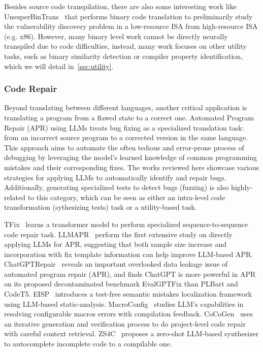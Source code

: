 \documentclass[pdflatex,sn-mathphys-ay,twocolumn, a4paper]{sn-jnl}%
\theoremstyle{thmstyleone}%
\theoremstyle{thmstyletwo}%
\theoremstyle{thmstylethree}%
\begin{document}
Besides source code transpilation, there are also some interesting work like UnsuperBinTrans~\citep{168_unsupervised2023_emnlp} that performs binary code translation to preliminarily study the vulnerability discovery problem in a low-resource ISA from high-resource ISA (e.g. x86). However, many binary level work cannot be directly neurally transpiled due to code difficulties, instead, many work focuses on other utility tasks, such as binary similarity detection or compiler property identification, which we will detail in~\autoref{sec:utility}.


\subsubsection{Code Repair}

Beyond translating between different languages, another critical application is translating a program from a flawed state to a correct one. Automated Program Repair (APR) using LLMs treats bug fixing as a specialized translation task: from an incorrect source program to a corrected version in the same language. This approach aims to automate the often tedious and error-prone process of debugging by leveraging the model's learned knowledge of common programming mistakes and their corresponding fixes. The works reviewed here showcase various strategies for applying LLMs to automatically identify and repair bugs. Additionally, generating specialized tests to detect bugs (fuzzing) is also highly-related to this category, which can be seen as either an intra-level code transformation (sythesizing tests) task or a utility-based task.

TFix~\citep{166_tfix2021_icml} learns a transformer model to perform specialized sequence-to-sequence code repair task.
LLMAPR~\citep{133_xia2023_icse} perform the first extensive study on directly applying LLMs for APR, suggesting that both sample size increase and incorporation with fix template information can help improve LLM-based APR.
ChatGPTRepair~\citep{148_zhang2023critical} reveals an important overlooked data leakage issue of automated program repair (APR), and finds ChatGPT is more powerful in APR on its proposed decontaminated benchmark EvalGPTFix than PLBart and CodeT5.
EISP~\citep{16_chen2024test} introduces a test-free semantic mistakes localization framework using LLM-based static-analysis.
MacroConfig~\citep{19_albuquerque2024evaluating} studies LLM's capabilities in resolving configurable macros errors with compilation feedback.
CoCoGen~\citep{110_bi-etal-2024-iterative} uses an iterative generation and verification process to do project-level code repair with careful context retrieval.
ZS4C~\citep{29_kabir2025zs4c} proposes a zero-shot LLM-based synthesizer to autocomplete incomplete code to a compilable one.
\end{document}
